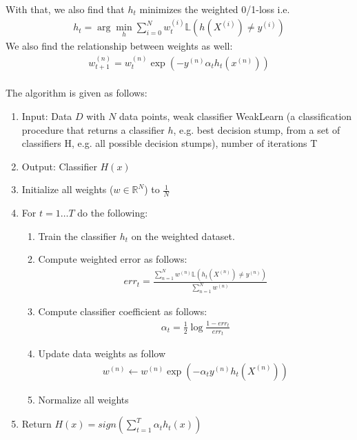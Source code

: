\documentclass{homework}
\begin{document}
 With that, we also find that $h_t$ minimizes the weighted 0/1-loss i.e.
 \begin{align*}
    h_t = \arg \min_{h} \sum_{i=0}^{N} w^{(i)}_t \mathbb{L}(h(X^{(i)}) \neq y^{(i)})
 \end{align*}
 We also find the relationship between weights as well:
 \begin{align*}
    w_{t+1}^{(n)} = w_t^{(n)} \exp(-y^{(n)}\alpha_t h_t(x^{(n)}))
 \end{align*}
 \\
The algorithm is given as follows:
\begin{enumerate}
    \item Input: Data $D$ with $N$ data points, weak classifier WeakLearn (a classification procedure that
    returns a classifier $h$, e.g. best decision stump, from a set of classifiers H, e.g.
    all possible decision stumps), number of iterations T
    \item Output: Classifier $H(x)$
    \item Initialize all weights ($w \in \mathbb{R}^N$) to $\frac{1}{N}$
    \item For $t = 1\dots T$ do the following:
        \begin{enumerate}
            \item Train the classifier $h_t$ on the weighted dataset.
            \item Compute weighted error as follows:
                \begin{align*}
                    err_t = \frac{\sum_{n=1}^{N}w^{(n)}\mathbb{L}(h_t(X^{(n)}) \neq y^{(n)})}{\sum_{n=1}^{N}w^{(n)}}
                \end{align*}
            \item Compute classifier coefficient as follows:
                \begin{align*}
                    \alpha_t = \frac{1}{2} \log \frac{1 - err_t}{err_t}
                \end{align*}
            \item Update data weights as follow 
                \begin{align*}
                    w^{(n)} \leftarrow w^{(n)} \exp(-\alpha_t y^{(n)}h_t(X^{(n)}))
                \end{align*}
            \item Normalize all weights
        \end{enumerate}
    \item Return $H(x) = sign(\sum_{t=1}^{T} \alpha_t h_t(x))$
\end{enumerate}
\end{document}
